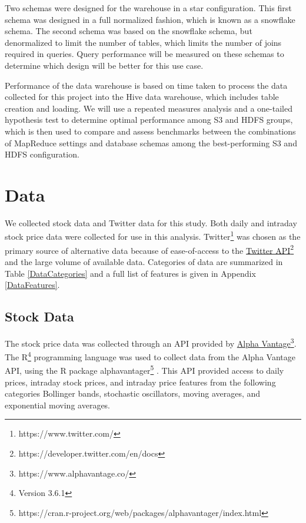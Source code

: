 \documentclass[journal]{IEEEtran}
\begin{document}
Two schemas were designed for the warehouse in a star configuration.
This first schema was designed in a full normalized fashion,
which is known as a snowflake schema.
The second schema was based on the snowflake schema, 
but denormalized to limit the number of tables, 
which limits the number of joins required in queries.
Query performance will be measured on these schemas to determine
which design will be better for this use case. 

Performance of the data warehouse is based on time taken to process the data
collected for this project into the Hive data warehouse,
which includes table creation and loading. 
We will use a repeated measures analysis and a one-tailed hypothesis 
test to determine optimal performance among S3 and HDFS groups, 
which is then used to compare and assess benchmarks between the 
combinations of MapReduce settings and database schemas among the
best-performing S3 and HDFS configuration.

\section{Data}

We collected stock data and Twitter data for this study.
Both daily and intraday stock price data were collected
 for use in this analysis. 
Twitter\footnote{https://www.twitter.com/}
 was chosen as the primary source of alternative data because of
 ease-of-access to the 
 \href{https://developer.twitter.com/en/docs}{Twitter API}\footnote{https://developer.twitter.com/en/docs}
 and the large volume of available data.
Categories of data are summarized in Table \ref{DataCategories} and a full
 list of features is given in Appendix \ref{DataFeatures}.


\subsection{Stock Data}

The stock price data was collected through an API provided by
 \href{https://www.alphavantage.co/}{Alpha Vantage}\footnote{https://www.alphavantage.co/}.
The R\footnote{Version 3.6.1}
 programming language was used to collect data from the Alpha Vantage API,
 using the R package alphavantager\footnote{https://cran.r-project.org/web/packages/alphavantager/index.html}
\cite{R}.
This API provided access to daily prices, intraday stock prices,
 and intraday price features from the following categories Bollinger bands, 
 stochastic oscillators, moving averages, and exponential moving averages. 
\end{document}

